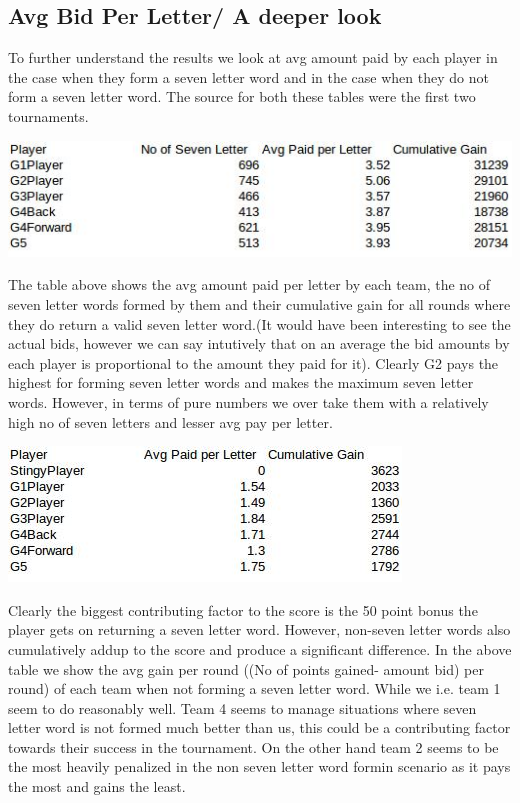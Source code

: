 \documentclass[11pt]{article}
\begin{document}
	\subsection{Avg Bid Per Letter/ A deeper look}
	To further understand the results we look at avg amount paid by each player in the case when they form a seven letter word and in the case when they do not form a seven letter word. The source for both these tables were the first two tournaments. 
	\begin{center}
\includegraphics[width=0.8 \textwidth]{AVGBidSevenY}
\end{center}
The table above shows the avg amount paid per letter by each team, the no of seven letter words formed by them and their cumulative gain for all rounds where they do return a valid seven letter word.(It would have been interesting to see the actual bids, however we can say intutively that on an average the bid amounts by each player is proportional to the amount they paid for it). Clearly G2 pays the highest for forming seven letter words and makes the maximum seven letter words. However, in terms of pure numbers we over take them with a relatively high no of seven letters and lesser avg pay per letter. 
	\begin{center}
\includegraphics[width=0.6 \textwidth]{AVGBidSevenN}
\end{center}
	Clearly the biggest contributing factor to the score is the 50 point bonus the player gets on returning a seven letter word. However, non-seven letter words also cumulatively addup to the score and produce a significant difference. In the above table we show the avg gain per round ((No of points gained- amount bid) per round) of each team when not forming a seven letter word. While we i.e. team 1 seem to do reasonably well. Team 4 seems to manage situations where seven letter word is not formed much better than us, this could be a contributing factor towards their success in the tournament. On the other hand team 2 seems to be the most heavily penalized in the non seven letter word formin scenario as it pays the most and gains the least. 
\end{document}
